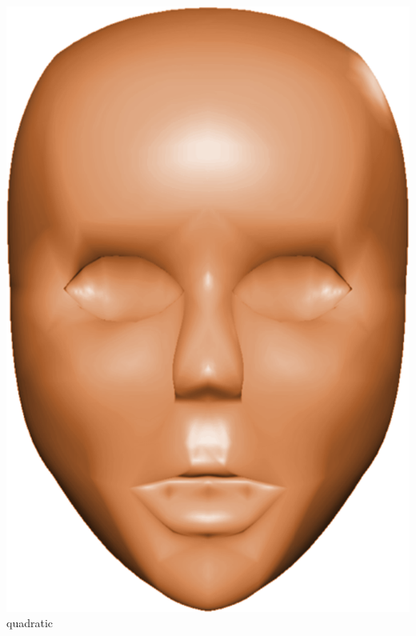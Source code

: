 \begin{frame}
\begin{columns}
\begin{column}{0.4\textwidth}
\begin{center}
					\includegraphics[width=\textwidth]{img/1_single/quadriticallyVaryingNormals.png}
					\small{quadratic}
				\end{center}	
			\end{column}
		\end{columns}
	\end{frame}


